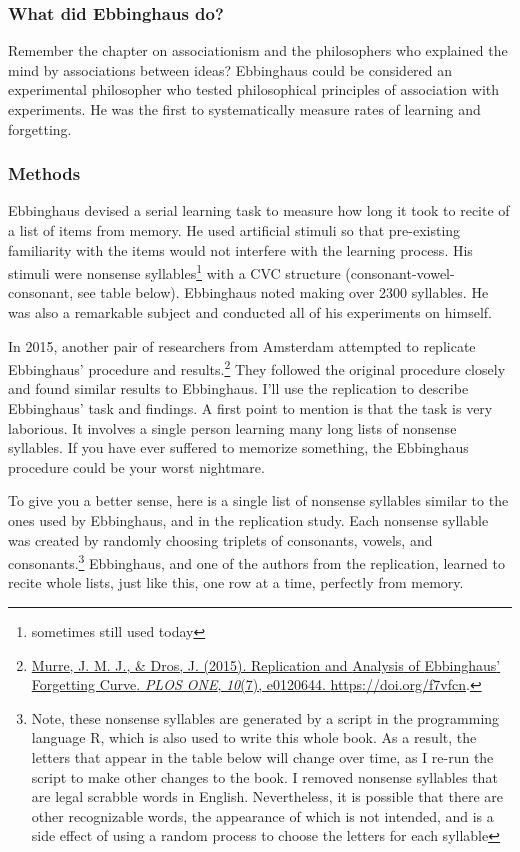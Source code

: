 \documentclass[
  oneside,
  12pt]{crumpbook}
\begin{document}
\hypertarget{what-did-ebbinghaus-do}{%
\subsubsection{What did Ebbinghaus do?}\label{what-did-ebbinghaus-do}}

Remember the chapter on associationism and the philosophers who explained the mind by associations between ideas? Ebbinghaus could be considered an experimental philosopher who tested philosophical principles of association with experiments. He was the first to systematically measure rates of learning and forgetting.

\hypertarget{methods-1}{%
\subsubsection{Methods}\label{methods-1}}

Ebbinghaus devised a serial learning task to measure how long it took to recite of a list of items from memory. He used artificial stimuli so that pre-existing familiarity with the items would not interfere with the learning process. His stimuli were nonsense syllables\footnote{sometimes still used today} with a CVC structure (consonant-vowel-consonant, see table below). Ebbinghaus noted making over 2300 syllables. He was also a remarkable subject and conducted all of his experiments on himself.

In 2015, another pair of researchers from Amsterdam attempted to replicate Ebbinghaus' procedure and results.\footnote{\protect\hyperlink{ref-murreReplicationAnalysisEbbinghaus2015}{Murre, J. M. J., \& Dros, J. (2015). Replication and {Analysis} of {Ebbinghaus}' {Forgetting Curve}. \emph{PLOS ONE}, \emph{10}(7), e0120644. \url{https://doi.org/f7vfcn}}.} They followed the original procedure closely and found similar results to Ebbinghaus. I'll use the replication to describe Ebbinghaus' task and findings. A first point to mention is that the task is very laborious. It involves a single person learning many long lists of nonsense syllables. If you have ever suffered to memorize something, the Ebbinghaus procedure could be your worst nightmare.

To give you a better sense, here is a single list of nonsense syllables similar to the ones used by Ebbinghaus, and in the replication study. Each nonsense syllable was created by randomly choosing triplets of consonants, vowels, and consonants.\footnote{Note, these nonsense syllables are generated by a script
  in the programming language R, which is also used to write this
  whole book. As a result, the letters that appear in the table below
  will change over time, as I re-run the script to make other changes
  to the book. I removed nonsense syllables that are legal scrabble
  words in English. Nevertheless, it is possible that there are other
  recognizable words, the appearance of which is not intended, and is
  a side effect of using a random process to choose the letters for
  each syllable} Ebbinghaus, and one of the authors from the replication, learned to recite whole lists, just like this, one row at a time, perfectly from memory.
\end{document}
